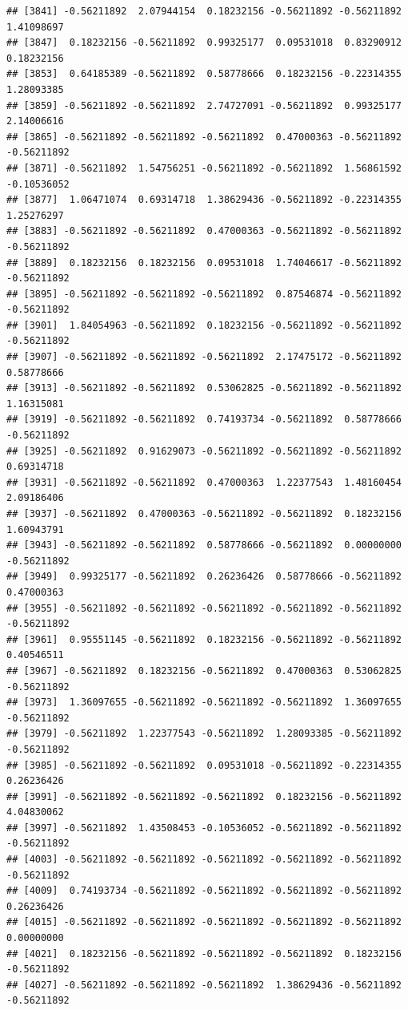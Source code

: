\documentclass[
]{article}
\begin{document}
\begin{verbatim}
## [3841] -0.56211892  2.07944154  0.18232156 -0.56211892 -0.56211892  1.41098697
## [3847]  0.18232156 -0.56211892  0.99325177  0.09531018  0.83290912  0.18232156
## [3853]  0.64185389 -0.56211892  0.58778666  0.18232156 -0.22314355  1.28093385
## [3859] -0.56211892 -0.56211892  2.74727091 -0.56211892  0.99325177  2.14006616
## [3865] -0.56211892 -0.56211892 -0.56211892  0.47000363 -0.56211892 -0.56211892
## [3871] -0.56211892  1.54756251 -0.56211892 -0.56211892  1.56861592 -0.10536052
## [3877]  1.06471074  0.69314718  1.38629436 -0.56211892 -0.22314355  1.25276297
## [3883] -0.56211892 -0.56211892  0.47000363 -0.56211892 -0.56211892 -0.56211892
## [3889]  0.18232156  0.18232156  0.09531018  1.74046617 -0.56211892 -0.56211892
## [3895] -0.56211892 -0.56211892 -0.56211892  0.87546874 -0.56211892 -0.56211892
## [3901]  1.84054963 -0.56211892  0.18232156 -0.56211892 -0.56211892 -0.56211892
## [3907] -0.56211892 -0.56211892 -0.56211892  2.17475172 -0.56211892  0.58778666
## [3913] -0.56211892 -0.56211892  0.53062825 -0.56211892 -0.56211892  1.16315081
## [3919] -0.56211892 -0.56211892  0.74193734 -0.56211892  0.58778666 -0.56211892
## [3925] -0.56211892  0.91629073 -0.56211892 -0.56211892 -0.56211892  0.69314718
## [3931] -0.56211892 -0.56211892  0.47000363  1.22377543  1.48160454  2.09186406
## [3937] -0.56211892  0.47000363 -0.56211892 -0.56211892  0.18232156  1.60943791
## [3943] -0.56211892 -0.56211892  0.58778666 -0.56211892  0.00000000 -0.56211892
## [3949]  0.99325177 -0.56211892  0.26236426  0.58778666 -0.56211892  0.47000363
## [3955] -0.56211892 -0.56211892 -0.56211892 -0.56211892 -0.56211892 -0.56211892
## [3961]  0.95551145 -0.56211892  0.18232156 -0.56211892 -0.56211892  0.40546511
## [3967] -0.56211892  0.18232156 -0.56211892  0.47000363  0.53062825 -0.56211892
## [3973]  1.36097655 -0.56211892 -0.56211892 -0.56211892  1.36097655 -0.56211892
## [3979] -0.56211892  1.22377543 -0.56211892  1.28093385 -0.56211892 -0.56211892
## [3985] -0.56211892 -0.56211892  0.09531018 -0.56211892 -0.22314355  0.26236426
## [3991] -0.56211892 -0.56211892 -0.56211892  0.18232156 -0.56211892  4.04830062
## [3997] -0.56211892  1.43508453 -0.10536052 -0.56211892 -0.56211892 -0.56211892
## [4003] -0.56211892 -0.56211892 -0.56211892 -0.56211892 -0.56211892 -0.56211892
## [4009]  0.74193734 -0.56211892 -0.56211892 -0.56211892 -0.56211892  0.26236426
## [4015] -0.56211892 -0.56211892 -0.56211892 -0.56211892 -0.56211892  0.00000000
## [4021]  0.18232156 -0.56211892 -0.56211892 -0.56211892  0.18232156 -0.56211892
## [4027] -0.56211892 -0.56211892 -0.56211892  1.38629436 -0.56211892 -0.56211892

\end{verbatim}
\end{document}
